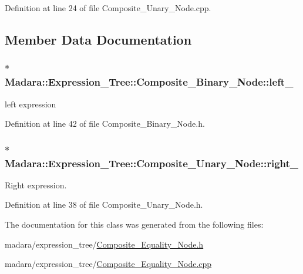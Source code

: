 Definition at line 24 of file Composite\_\-Unary\_\-Node.cpp.



\subsection{Member Data Documentation}
\hypertarget{classMadara_1_1Expression__Tree_1_1Composite__Binary__Node_acac60a70beb2484737e6e7161edb2d1b}{
\subsubsection[{left\_\-}]{$\ast$ {\bf Madara::Expression\_\-Tree::Composite\_\-Binary\_\-Node::left\_\-}}}
\label{df/d55/classMadara_1_1Expression__Tree_1_1Composite__Binary__Node_acac60a70beb2484737e6e7161edb2d1b}


left expression 



Definition at line 42 of file Composite\_\-Binary\_\-Node.h.

\hypertarget{classMadara_1_1Expression__Tree_1_1Composite__Unary__Node_a077b7bd1b52df6f5c6adfde735556a68}{
\subsubsection[{right\_\-}]{$\ast$ {\bf Madara::Expression\_\-Tree::Composite\_\-Unary\_\-Node::right\_\-}}}
\label{d3/dc7/classMadara_1_1Expression__Tree_1_1Composite__Unary__Node_a077b7bd1b52df6f5c6adfde735556a68}


Right expression. 



Definition at line 38 of file Composite\_\-Unary\_\-Node.h.



The documentation for this class was generated from the following files:\begin{DoxyCompactItemize}
\item 
madara/expression\_\-tree/\hyperlink{Composite__Equality__Node_8h}{Composite\_\-Equality\_\-Node.h}\item 
madara/expression\_\-tree/\hyperlink{Composite__Equality__Node_8cpp}{Composite\_\-Equality\_\-Node.cpp}\end{DoxyCompactItemize}
